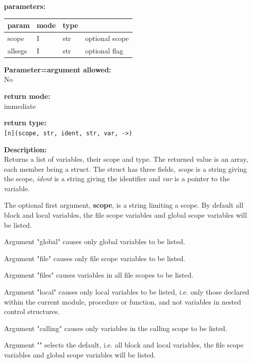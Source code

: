        {\bf parameters:} \\
        \begin{tabular}{| l | l | l | l |}
        \hline
        param  & mode & type & \\
        \hline \hline
        scope & I & str & optional scope \\ \hline
        allsegs & I & str & optional flag \\ \hline
        \end{tabular}
        
        {\bf Parameter=argument allowed:} \\
        No
        
        {\bf return mode:} \\
        immediate

        {\bf return type:} \\
        \verb'[n](scope, str, ident, str, var, ->)'
        
        {\bf Description:} \\
        Returns a list of variables, their scope and type. The returned value is
        an array, each member being a struct. The struct has three fields, {\em
        scope} is a string giving the scope, {\em ident} is a string giving the
        identifier and {\em var} is a pointer to the variable.

        The optional first argument, {\bf scope},  is a string limiting a scope.
        By default all block and local variables, the file scope variables and
        global scope variables will be listed.
        
        Argument "global" causes only global variables to be listed.

        Argument "file" causes only file scope variables to be listed.

        Argument "files" causes variables in all file scopes to be listed.

        Argument "local" causes only local variables to be listed, i.e. only
        those declared within the current module, procedure or function, and
        not variables in nested control structures.

        Argument "calling" causes only variables in the calling scope to be
        listed.
        
        Argument "" selects the default, i.e. all block and local variables, the
        file scope variables and global scope variables will be listed.
        
